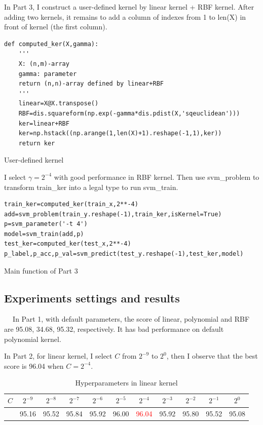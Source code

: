 \documentclass{article}
\begin{document}
In Part 3, I construct a user-defined kernel by linear kernel + RBF kernel. After adding two kernels, it remains to add a column of indexes from 1 to len(X) in front of kernel (the first column).
\begin{listing}[!ht]
\begin{verbatim}
def computed_ker(X,gamma):
    '''
    X: (n,m)-array
    gamma: parameter
    return (n,n)-array defined by linear+RBF
    '''
    linear=X@X.transpose()
    RBF=dis.squareform(np.exp(-gamma*dis.pdist(X,'sqeuclidean')))
    ker=linear+RBF
    ker=np.hstack((np.arange(1,len(X)+1).reshape(-1,1),ker))
    return ker
\end{verbatim}
\caption{User-defined kernel}
\label{listing}
\end{listing}

\newpage

I select $\gamma=2^{-4}$ with good performance in RBF kernel. Then use svm\_problem to transform train\_ker into a legal type to run svm\_train.
\begin{listing}[!ht]
\begin{verbatim}
train_ker=computed_ker(train_x,2**-4)
add=svm_problem(train_y.reshape(-1),train_ker,isKernel=True)
p=svm_parameter('-t 4')
model=svm_train(add,p)
test_ker=computed_ker(test_x,2**-4)
p_label,p_acc,p_val=svm_predict(test_y.reshape(-1),test_ker,model)
\end{verbatim}
\caption{Main function of Part 3}
\label{listing}
\end{listing}

\subsection{Experiments settings and results}

$\quad\ $In Part 1, with default parameters, the score of linear, polynomial and RBF are 95.08, 34.68, 95.32, respectively. It has bad performance on default polynomial kernel.

In Part 2, for linear kernel, I select $C$ from $2^{-9}$ to $2^0$, then I observe that the best score is 96.04 when $C=2^{-4}$. 

\begin{table}[h!]
\begin{center}
\begin{tabular}{ |c|c|c|c|c|c|c|c|c|c|c| } 
 \hline
$C$  & $2^{-9}$ &$2^{-8}$ &$2^{-7}$ &$2^{-6}$ &$2^{-5}$ &$2^{-4}$ & $2^{-3}$& $2^{-2}$& $2^{-1}$& $2^0$ \\ \hline
& 95.16 & 95.52 & 95.84 & 95.92 & 96.00 & \textcolor{red}{96.04} & 95.92 & 95.80 & 95.52 & 95.08 \\ \hline
\end{tabular}
\end{center}
\caption{Hyperparameters in linear kernel}
\label{table}
\end{table}
\end{document}
